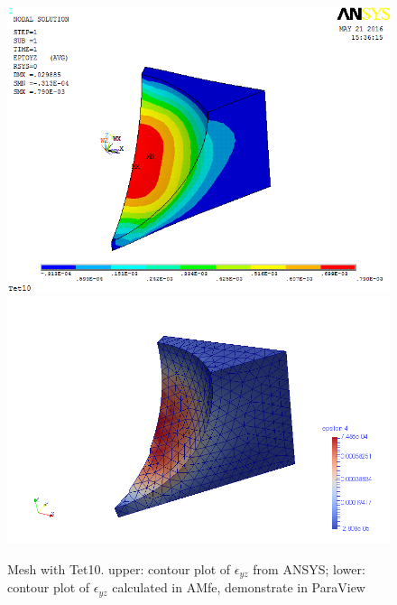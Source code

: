\begin{figure}[htbp]
	\begin{center}
		\includegraphics[width=13cm,clip]{Tet10_Eyz.png} 		
		\includegraphics[width=13cm,clip]{Tet10_Eyz_P.png} 		
		\caption{Mesh with Tet10. upper: contour plot of $\epsilon_{yz}$ from ANSYS; lower: contour plot of $\epsilon_{yz}$ calculated in AMfe, demonstrate in ParaView} \label{fig: Tet10_Eyz}
	\end{center}
\end{figure}

